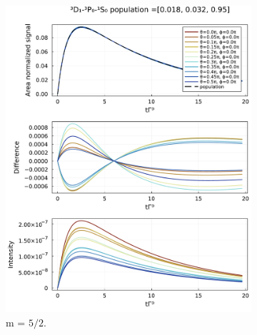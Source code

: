 \documentclass{article}
\begin{document}
\begin{figure}
    \centering
    \begin{subfigure}[b]{.45\textwidth}
        \includegraphics[width=\textwidth]{[4]|F_i=2.5,1.5,1.5,0.5|displacement=1.154,0.0,0.0|exc_frac=0.018,0.032|m_exc=2.5.jld2_int-pop.pdf}
        \caption{m = $5/2$.}
    \end{subfigure}
    \begin{subfigure}[b]{.45\textwidth}

\end{subfigure}
\end{figure}
\end{document}

